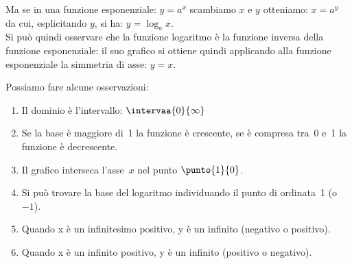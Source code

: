 \begin{minipage}{.35\textwidth}
\begin{center}
\begin{inaccessibleblock}[Grafico di una funzione esponenziale e 
il suo simmetrico rispetto a y=x]
  \graficologaritmica
\end{inaccessibleblock}
\end{center}
\end{minipage} \qquad
\begin{minipage}{.6\textwidth}
Ma se in una funzione esponenziale: \(y=a^x\) scambiamo \(x\) e \(y\) 
otteniamo: \(x=a^y\) da cui, esplicitando \(y\), si ha: \(y=\log_a 
x\).\\[7pt] Si può quindi 
osservare che la funzione logaritmo è la funzione inversa della funzione 
esponenziale: il suo grafico si ottiene quindi applicando alla funzione 
esponenziale la simmetria di asse: \(y=x\).
\end{minipage}

\begin{minipage}{.52\textwidth}
 Possiamo fare alcune osservazioni:
\begin{enumerate}
 \item Il dominio è l'intervallo: \(\intervaa{0}{\infty}\)
 \item Se la base è maggiore di~1 la funzione è crescente, 
 se è compresa tra~0 e~1 la funzione è decrescente.
 \item Il grafico interseca l'asse~\(x\) nel punto \(\punto{1}{0}\).
 \item Si può trovare la base del logaritmo individuando il punto di 
 ordinata~1 (o~\(-1\)).
 \item Quando x è un infinitesimo positivo, y è un infinito (negativo o 
positivo).
 \item Quando x è un infinito positivo, y è un infinito (positivo o 
negativo).
\end{enumerate}
\end{minipage} \qquad 
\begin{minipage}{.45\textwidth}
 \begin{inaccessibleblock}
  \logdiversebasi
\label{fig:diversebasi}
\end{inaccessibleblock}
\label{fig:log_diversebasi}
\end{minipage}

